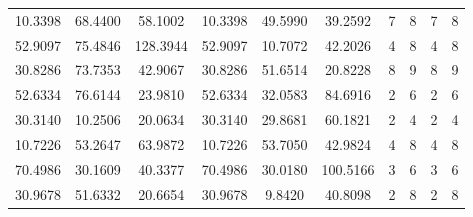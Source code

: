 \documentclass[withoutpreface,bwprint]{cumcmthesis} %
\begin{document}
\begin{appendices}
\begin{table}[htbp!]
\begin{tabular}{@{}cccccccccc@{}}
						10.3398                          & 68.4400                          & 58.1002                          & 10.3398                          & 49.5990                          & 39.2592                          & 7                    & 8                    & 7                      & 8                      \\
						52.9097                          & 75.4846                          & 128.3944                         & 52.9097                          & 10.7072                          & 42.2026                          & 4                    & 8                    & 4                      & 8                      \\
						30.8286                          & 73.7353                          & 42.9067                          & 30.8286                          & 51.6514                          & 20.8228                          & 8                    & 9                    & 8                      & 9                      \\
						52.6334                          & 76.6144                          & 23.9810                          & 52.6334                          & 32.0583                          & 84.6916                          & 2                    & 6                    & 2                      & 6                      \\
						30.3140                          & 10.2506                          & 20.0634                          & 30.3140                          & 29.8681                          & 60.1821                          & 2                    & 4                    & 2                      & 4                      \\
						10.7226                          & 53.2647                          & 63.9872                          & 10.7226                          & 53.7050                          & 42.9824                          & 4                    & 8                    & 4                      & 8                      \\
						70.4986                          & 30.1609                          & 40.3377                          & 70.4986                          & 30.0180                          & 100.5166                         & 3                    & 6                    & 3                      & 6                      \\
						30.9678                          & 51.6332                          & 20.6654                          & 30.9678                          & 9.8420                           & 40.8098                          & 2                    & 8                    & 2                      & 8                      \\

\end{tabular}
\end{table}
\end{appendices}
\end{document}
